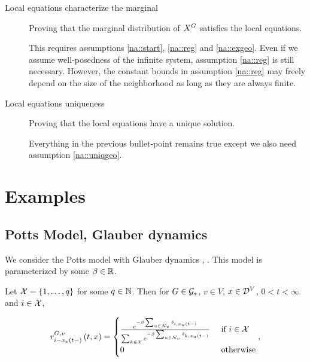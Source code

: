 \begin{description}
\item[Local equations characterize the marginal] Proving that the marginal distribution of \(X^{G}\) satisfies the local equations.

This requires assumptions \ref{na::start}, \ref{na::reg} and \ref{na::exgeo}. Even if we assume well-posedness of the infinite system, assumption \ref{na::reg} is still necessary. However, the constant bounds in assumption \ref{na::reg} may freely depend on the size of the neighborhood as long as they are always finite.


\item[Local equations uniqueness] Proving that the local equations have a unique solution.

Everything in the previous bullet-point remains true except we also need assumption \ref{na::uniqgeo}.
\end{description}

\section{Examples}
\label{ex}

\subsection{Potts Model, Glauber dynamics}
\label{ex::Potts}

We consider the Potts model with Glauber dynamics \cite{Gla63}, .  This model is parameterized by some \(\beta\in\mathbb{R}\).

\ind Let \(\mathcal{X} = \{1,\dots,q\}\) for some \(q \in \mathbb{N}\). Then for \(G \in \mathcal{G}_\ast\), \(v\in V\), \(x \in \mathcal{D}^V\), \(0 < t < \infty\) and \(i \in \mathcal{X}\), 

\[\rate\gvpara{G}{v}\stpara{i-\xf\vind{v}\tme{t-}}\tmepro{t}{\xf}{} = \begin{cases}
\frac{e^{-\beta\sum_{u\in\neigh{v}} \delta_{i,\xf_u\tme{t-}}}}{\sum_{k \in \sta} e^{-\beta\sum_{u\in\neigh{v}} \delta_{k,\xf_u\tme{t-}}}} &\te{ if } i \in \sta\\
0 &\te{ otherwise}
\end{cases},\]

